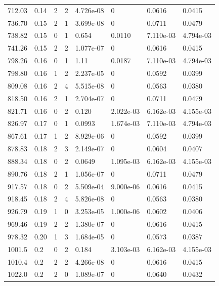 \documentclass[preview]{standalone}
\begin{document}
{{{\begin{tabular}{L{1.2cm}C{1.2cm} C{0.3cm}C{0.5cm} C{1.4cm}C{1.4cm} C{1.4cm}C{1.4cm}}
  712.03  &  0.14  & 2     &  2 &  4.726e-08  & 0  & 0.0616 &  0.0415   \\ 
  736.70  &  0.15  & 2     &  1 &  3.699e-08  & 0  & 0.0711 &  0.0479   \\ 
  738.82  &  0.15  & 0     &  1 &  0.654  & 0.0110  & 7.110e-03 &  4.794e-03   \\ 
  741.26  &  0.15  & 2     &  2 &  1.077e-07  & 0  & 0.0616 &  0.0415   \\ 
  798.26  &  0.16  & 0     &  1 &  1.11  & 0.0187  & 7.110e-03 &  4.794e-03   \\ 
  798.80  &  0.16  & 1     &  2 &  2.237e-05  & 0  & 0.0592 &  0.0399   \\ 
  809.08  &  0.16  & 2     &  4 &  5.515e-08  & 0  & 0.0563 &  0.0380   \\ 
  818.50  &  0.16  & 2     &  1 &  2.704e-07  & 0  & 0.0711 &  0.0479   \\ 
  821.71  &  0.16  & 0     &  2 &  0.120  & 2.022e-03  & 6.162e-03 &  4.155e-03   \\ 
  826.97  &  0.17  & 0     &  1 &  0.0993  & 1.674e-03  & 7.110e-03 &  4.794e-03   \\ 
  867.61  &  0.17  & 1     &  2 &  8.929e-06  & 0  & 0.0592 &  0.0399   \\ 
  878.83  &  0.18  & 2     &  3 &  2.149e-07  & 0  & 0.0604 &  0.0407   \\ 
  888.34  &  0.18  & 0     &  2 &  0.0649  & 1.095e-03  & 6.162e-03 &  4.155e-03   \\ 
  890.76  &  0.18  & 2     &  1 &  1.056e-07  & 0  & 0.0711 &  0.0479   \\ 
  917.57  &  0.18  & 0     &  2 &  5.509e-04  & 9.000e-06  & 0.0616 &  0.0415   \\ 
  918.45  &  0.18  & 2     &  4 &  5.826e-08  & 0  & 0.0563 &  0.0380   \\ 
  926.79  &  0.19  & 1     &  0 &  3.253e-05  & 1.000e-06  & 0.0602 &  0.0406   \\ 
  969.46  &  0.19  & 2     &  2 &  1.380e-07  & 0  & 0.0616 &  0.0415   \\ 
  978.32  &  0.20  & 1     &  3 &  1.684e-05  & 0  & 0.0573 &  0.0387   \\ 
  1001.5  &   0.2  & 0     &  2 &  0.184  & 3.103e-03  & 6.162e-03 &  4.155e-03   \\ 
  1010.4  &   0.2  & 2     &  2 &  4.266e-08  & 0  & 0.0616 &  0.0415   \\ 
  1022.0  &   0.2  & 2     &  0 &  1.089e-07  & 0  & 0.0640 &  0.0432   \\ 

\end{tabular}}}}
\end{document}
